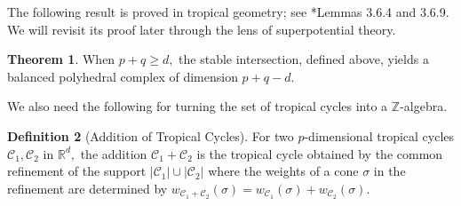 \documentclass[11pt]{amsart}
\theoremstyle{definition}
\newtheorem{theorem}{Theorem}[section]
\newtheorem{definition}[theorem]{Definition}
\newcommand{\Z}{\mathbb{Z}}
\newcommand{\cC}{\mathcal{C}}
\begin{document}
The following result is proved in tropical geometry; see \cite{Maclagan-Sturmfels}*{Lemmas 3.6.4 and 3.6.9}. We will revisit its proof later through the lens of superpotential theory.
\begin{theorem}\label{thm:stable-invar}
When $p+q \geq d,$ the stable intersection, defined above, yields a balanced polyhedral complex of dimension $p+q-d$.
\end{theorem}
We also need the following for turning the set of tropical cycles into a $\Z$-algebra. 
\begin{definition}[Addition of Tropical Cycles]\label{def:add-trop}
    For two $p$-dimensional tropical cycles $\cC_1, \cC_2$ in $\mathbb{R}^d,$ the addition $\cC_1 + \cC_2$ is the tropical cycle obtained by the common refinement of the support $|\cC_1| \cup |\cC_2|$ where the weights of a cone $\sigma$ in the refinement are determined by $w_{\cC_1 + \cC_2}(\sigma) = w_{\cC_1}(\sigma) + w_{\cC_2}(\sigma).$
\end{definition}
\end{document}
